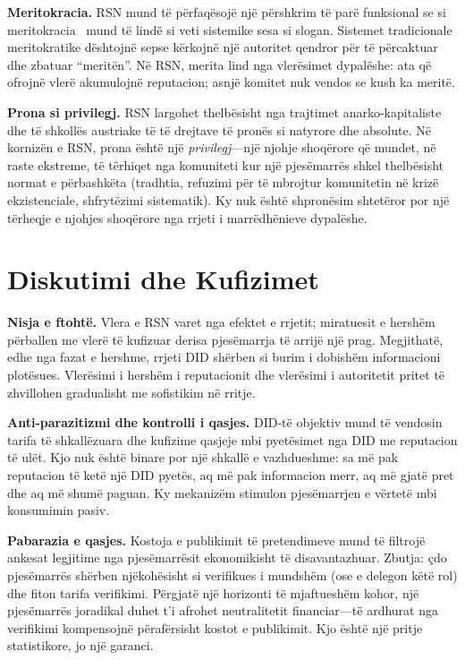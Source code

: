 \documentclass[11pt,a4paper,twocolumn]{article}
\begin{document}
\textbf{Meritokracia.} RSN mund të përfaqësojë një përshkrim të parë funksional se si meritokracia~\cite{young1958} mund të lindë si veti sistemike sesa si slogan. Sistemet tradicionale meritokratike dështojnë sepse kërkojnë një autoritet qendror për të përcaktuar dhe zbatuar ``meritën''. Në RSN, merita lind nga vlerësimet dypalëshe: ata që ofrojnë vlerë akumulojnë reputacion; asnjë komitet nuk vendos se kush ka meritë.

\textbf{Prona si privilegj.} RSN largohet thelbësisht nga trajtimet anarko-kapitaliste dhe të shkollës austriake të të drejtave të pronës si natyrore dhe absolute. Në kornizën e RSN, prona është një \emph{privilegj}---një njohje shoqërore që mundet, në raste ekstreme, të tërhiqet nga komuniteti kur një pjesëmarrës shkel thelbësisht normat e përbashkëta (tradhtia, refuzimi për të mbrojtur komunitetin në krizë ekzistenciale, shfrytëzimi sistematik). Ky nuk është shpronësim shtetëror por një tërheqje e njohjes shoqërore nga rrjeti i marrëdhënieve dypalëshe.

\section{Diskutimi dhe Kufizimet}

\textbf{Nisja e ftohtë.} Vlera e RSN varet nga efektet e rrjetit; miratuesit e hershëm përballen me vlerë të kufizuar derisa pjesëmarrja të arrijë një prag. Megjithatë, edhe nga fazat e hershme, rrjeti DID shërben si burim i dobishëm informacioni plotësues. Vlerësimi i hershëm i reputacionit dhe vlerësimi i autoritetit pritet të zhvillohen gradualisht me sofistikim në rritje.

\textbf{Anti-parazitizmi dhe kontrolli i qasjes.} DID-të objektiv mund të vendosin tarifa të shkallëzuara dhe kufizime qasjeje mbi pyetësimet nga DID me reputacion të ulët. Kjo nuk është binare por një shkallë e vazhdueshme: sa më pak reputacion të ketë një DID pyetës, aq më pak informacion merr, aq më gjatë pret dhe aq më shumë paguan. Ky mekanizëm stimulon pjesëmarrjen e vërtetë mbi konsumimin pasiv.

\textbf{Pabarazia e qasjes.} Kostoja e publikimit të pretendimeve mund të filtrojë ankesat legjitime nga pjesëmarrësit ekonomikisht të disavantazhuar. Zbutja: çdo pjesëmarrës shërben njëkohësisht si verifikues i mundshëm (ose e delegon këtë rol) dhe fiton tarifa verifikimi. Përgjatë një horizonti të mjaftueshëm kohor, një pjesëmarrës joradikal duhet t'i afrohet neutralitetit financiar---të ardhurat nga verifikimi kompensojnë përafërsisht kostot e publikimit. Kjo është një pritje statistikore, jo një garanci.
\end{document}
